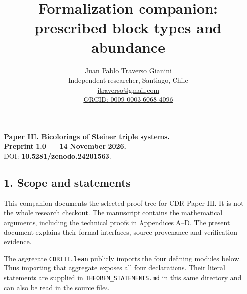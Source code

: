 \documentclass[english,11pt,a4paper]{article}
\title{Formalization companion: prescribed block types and abundance}
\author{Juan Pablo Traverso Gianini\\\small Independent researcher, Santiago, Chile\\\small \href{mailto:jtraverso@gmail.com}{jtraverso@gmail.com}\\\small \href{https://orcid.org/0009-0003-6068-4096}{ORCID: 0009-0003-6068-4096}}
\date{}
\begin{document}
\raggedbottom\maketitle
\textbf{Paper III. Bicolorings of Steiner triple systems.}\\
\textbf{Preprint 1.0 --- 14 November 2026.}\\
DOI: \textbf{10.5281/zenodo.24201563}.

\subsection{1. Scope and statements}\label{scope-and-statements}

This companion documents the selected proof tree for CDR Paper III. It is not the whole research checkout. The manuscript contains the mathematical arguments, including the technical proofs in Appendices A--D. The present document explains their formal interfaces, source provenance and verification evidence.

The aggregate \texttt{CDRIII.\allowbreak{}lean} publicly imports the four defining modules below. Thus importing that aggregate exposes all four declarations. Their literal statements are supplied in \texttt{THEOREM\_\allowbreak{}STATEMENTS.\allowbreak{}md} in this same directory and can also be read in the source files.
\end{document}
